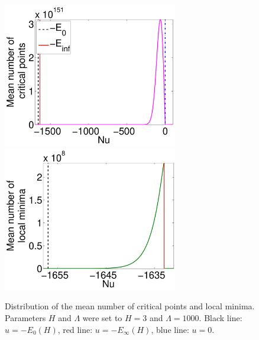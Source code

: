 \documentclass[twoside]{article}
\begin{document}
\begin{figure}[htp!]
  \center
\includegraphics[width = 3in]{Distr_cp.pdf} 
\includegraphics[width = 3in]{Distr_lm.pdf}
\caption{Distribution of the mean number of critical points and local minima. Parameters $H$ and $\Lambda$ were set to $H = 3$ and $\Lambda = 1000$. Black line: $u = -E_0(H)$, red line: $u = -E_{\infty}(H)$, blue line: $u = 0$.}
\label{fig:Distr_cp_lm}
\end{figure}
\end{document}
